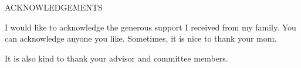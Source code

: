 \documentclass[main.tex]{subfiles}
\begin{document}
\newpage

\begin{center}
ACKNOWLEDGEMENTS
\end{center}

I would like to acknowledge the generous support I received from my family. You can acknowledge anyone
you like.  Sometimes, it is nice to thank your mom.

It is also kind to thank your advisor and committee members.
\end{document}
